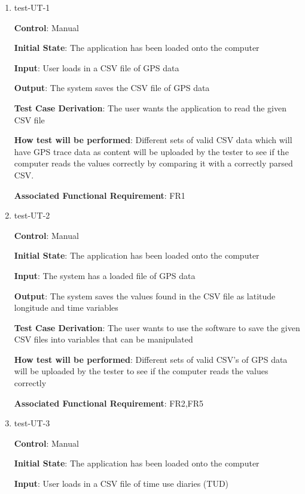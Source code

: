 \documentclass[12pt, titlepage]{article}
\begin{document}
\begin{enumerate}

\item{test-UT-1\\}

\textbf{Control}: Manual 
					
\textbf{Initial State}: The application has been loaded onto the computer
					
\textbf{Input}: User loads in a CSV file of GPS data
				
\textbf{Output}: The system saves the CSV file of GPS data

\textbf{Test Case Derivation}: The user wants the application to read the given CSV file 
					
\textbf{How test will be performed}: Different sets of valid CSV data which will have GPS trace data as content will be uploaded by the tester to see if the computer reads the values correctly by comparing it with a correctly parsed CSV. 

\textbf{Associated Functional Requirement}: FR1 

\item{test-UT-2\\}

\textbf{Control}: Manual 
					
\textbf{Initial State}: The application has been loaded onto the computer
					
\textbf{Input}: The system has a loaded file of GPS data 
					
\textbf{Output}: The system saves the values found in the CSV file as latitude longitude and time variables

\textbf{Test Case Derivation}: The user wants to use the software to save the given CSV files into variables that can be manipulated
					
\textbf{How test will be performed}: Different sets of valid CSV's of GPS data will be uploaded by the tester to see if the computer reads the values correctly

\textbf{Associated Functional Requirement}: FR2,FR5

\item{test-UT-3\\}

\textbf{Control}: Manual 
					
\textbf{Initial State}: The application has been loaded onto the computer
					
\textbf{Input}: User loads in a CSV file of time use diaries (TUD)
					

\end{enumerate}
\end{document}
